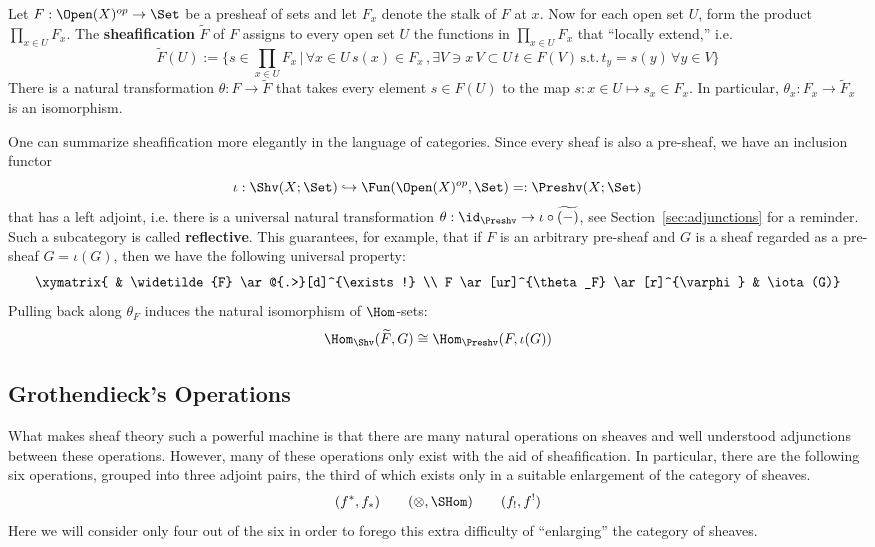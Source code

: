 \begin{defn}[Sheafification]\label{defn:sheafification}
Let $F:\Open(X)^{op}\to\Set$ be a presheaf of sets and let $F_x$ denote the stalk of $F$ at $x$. Now for each open set $U$, form the product $\prod_{x\in U}F_x$. The \textbf{sheafification} $\widetilde{F}$ of $F$ assigns to every open set $U$ the functions in $\prod_{x\in U}F_x$ that ``locally extend,'' i.e.
\[
\widetilde{F}(U):=\{s\in \prod_{x\in U}F_x\,|\, \forall x\in U\, s(x)\in F_x\,, \exists V\ni x\, V\subset U\,t\in F(V)\,\mathrm{s.t.}\, t_y=s(y)\,\forall y\in V\}
\]
There is a natural transformation $\theta:F\to \widetilde{F}$ that takes every element $s\in F(U)$ to the map $s:x\in U \mapsto s_x\in F_x$. In particular, $\theta_x:F_x\to\widetilde{F}_x$ is an isomorphism.
\end{defn}

One can summarize sheafification more elegantly in the language of categories. Since every sheaf is also a pre-sheaf, we have an inclusion functor
\[
\iota:\Shv(X;\Set)\hookrightarrow \Fun(\Open(X)^{op},\Set)=:\Preshv(X;\Set)
\]
that has a left adjoint, i.e. there is a universal natural transformation $\theta:\id_{\Preshv}\to \iota\circ \widetilde{(-)}$, see Section~\ref{sec:adjunctions} for a reminder. Such a subcategory is called \textbf{reflective}. This guarantees, for example, that if $F$ is an arbitrary pre-sheaf and $G$ is a sheaf regarded as a pre-sheaf $G=\iota(G)$, then we have the following universal property:
\[
\xymatrix{ & \widetilde{F} \ar@{.>}[d]^{\exists !} \\ F \ar[ur]^{\theta_F} \ar[r]^{\varphi} & \iota(G)}
\]
Pulling back along $\theta_F$ induces the natural isomorphism of $\Hom$-sets:
\[
\Hom_{\Shv}(\widetilde{F},G)\cong \Hom_{\Preshv}(F,\iota(G))
\]

\subsection{Grothendieck's Operations}\label{subsec:six_ops}

What makes sheaf theory such a powerful machine is that there are many natural operations on sheaves and well understood adjunctions between these operations. However, many of these operations only exist with the aid of sheafification. In particular, there are the following six operations, grouped into three adjoint pairs, the third of which exists only in a suitable enlargement of the category of sheaves.
\[
(f^*,f_*) \qquad (\otimes,\SHom) \qquad (f_!,f^!)
\]
Here we will consider only four out of the six in order to forego this extra difficulty of ``enlarging'' the category of sheaves.

